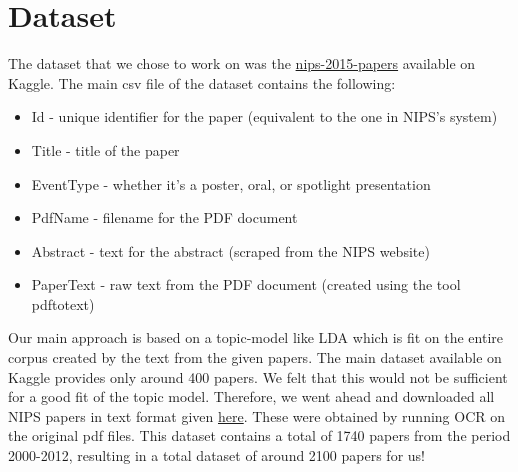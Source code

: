 \section{Dataset}
The dataset that we chose to work on was the \href{https://www.kaggle.com/benhamner/nips-2015-papers}{nips-2015-papers} available on Kaggle. The main csv file of the dataset contains the following:
\begin{itemize}
\item Id - unique identifier for the paper (equivalent to the one in NIPS's system)
\item Title - title of the paper
\item EventType - whether it's a poster, oral, or spotlight presentation
\item PdfName - filename for the PDF document
\item Abstract - text for the abstract (scraped from the NIPS website)
\item PaperText - raw text from the PDF document (created using the tool pdftotext)
\end{itemize}

Our main approach is based on a topic-model like LDA \cite{blei2003latent} which is fit on the entire corpus created by the text from the given papers. The main dataset available on Kaggle provides only around 400 papers. We felt that this would not be sufficient for a good fit of the topic model. Therefore, we went ahead and downloaded all NIPS papers in text format given \href{http://www.cs.nyu.edu/~roweis/data.html}{here}. These were obtained by running OCR on the original pdf files. This dataset contains a total of 1740 papers from the period 2000-2012, resulting in a total dataset of around 2100 papers for us!

